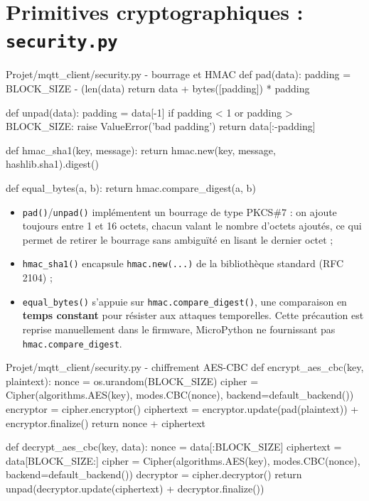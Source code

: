 \documentclass[a4paper,11pt]{report}
\begin{document}
\section{Primitives cryptographiques : \texttt{security.py}}

\begin{pycode}{Projet/mqtt\_client/security.py - bourrage et HMAC}
def pad(data):
    padding = BLOCK_SIZE - (len(data) %
    return data + bytes([padding]) * padding

def unpad(data):
    padding = data[-1]
    if padding < 1 or padding > BLOCK_SIZE:
        raise ValueError('bad padding')
    return data[:-padding]

def hmac_sha1(key, message):
    return hmac.new(key, message, hashlib.sha1).digest()

def equal_bytes(a, b):
    return hmac.compare_digest(a, b)
\end{pycode}

\begin{itemize}
    \item \texttt{pad()}/\texttt{unpad()} implémentent un bourrage de type PKCS\#7 : on ajoute toujours
    entre 1 et 16 octets, chacun valant le nombre d'octets ajoutés, ce qui permet de retirer le bourrage
    sans ambiguïté en lisant le dernier octet ;
    \item \texttt{hmac\_sha1()} encapsule \texttt{hmac.new(...)} de la bibliothèque standard (RFC 2104) ;
    \item \texttt{equal\_bytes()} s'appuie sur \texttt{hmac.compare\_digest()}, une comparaison en
    \textbf{temps constant} pour résister aux attaques temporelles. Cette précaution est reprise
    manuellement dans le firmware, MicroPython ne fournissant pas \texttt{hmac.compare\_digest}.
\end{itemize}

\begin{pycode}{Projet/mqtt\_client/security.py - chiffrement AES-CBC}
def encrypt_aes_cbc(key, plaintext):
    nonce = os.urandom(BLOCK_SIZE)
    cipher = Cipher(algorithms.AES(key), modes.CBC(nonce), backend=default_backend())
    encryptor = cipher.encryptor()
    ciphertext = encryptor.update(pad(plaintext)) + encryptor.finalize()
    return nonce + ciphertext

def decrypt_aes_cbc(key, data):
    nonce = data[:BLOCK_SIZE]
    ciphertext = data[BLOCK_SIZE:]
    cipher = Cipher(algorithms.AES(key), modes.CBC(nonce), backend=default_backend())
    decryptor = cipher.decryptor()
    return unpad(decryptor.update(ciphertext) + decryptor.finalize())
\end{pycode}
\end{document}
